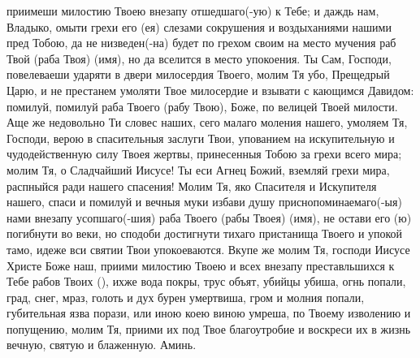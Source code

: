 \begin{mymulticols}
приимеши милостию Твоею внезапу отшедшаго(-ую) к Тебе; и даждь нам, Владыко, омыти грехи его (ея) слезами сокрушения и воздыханиями нашими пред Тобою, да не низведен(-на) будет по грехом своим на место мучения раб Твой (раба Твоя) (имя), но да вселится в место упокоения. Ты Сам, Господи, повелеваеши ударяти в двери милосердия Твоего, молим Тя убо, Прещедрый Царю, и не престанем умоляти Твое милосердие и взывати с кающимся Давидом: помилуй, помилуй раба Твоего (рабу Твою), Боже, по велицей Твоей милости. Аще же недовольно Ти словес наших, сего малаго моления нашего, умоляем Тя, Господи, верою в спасительныя заслуги Твои, упованием на искупительную и чудодейственную силу Твоея жертвы, принесенныя Тобою за грехи всего мира; молим Тя, о Сладчайший Иисусе! Ты еси Агнец Божий, вземляй грехи мира, распныйся ради нашего спасения! Молим Тя, яко Спасителя и Искупителя нашего, спаси и помилуй и вечныя муки избави душу приснопоминаемаго(-ыя) нами внезапу усопшаго(-шия) раба Твоего (рабы Твоея) (имя), не остави его (ю) погибнути во веки, но сподоби достигнути тихаго пристанища Твоего и упокой тамо, идеже вси святии Твои упокоеваются. Вкупе же молим Тя, господи Иисусе Христе Боже наш, приими милостию Твоею и всех внезапу преставльшихся к Тебе рабов Твоих (), ихже вода покры, трус объят, убийцы убиша, огнь попали, град, снег, мраз, голоть и дух бурен умертвиша, гром и молния попали, губительная язва порази, или иною коею виною умреша, по Твоему изволению и попущению, молим Тя, приими их под Твое благоутробие и воскреси их в жизнь вечную, святую и блаженную. Аминь.

\end{mymulticols}

\mychapterending


 


